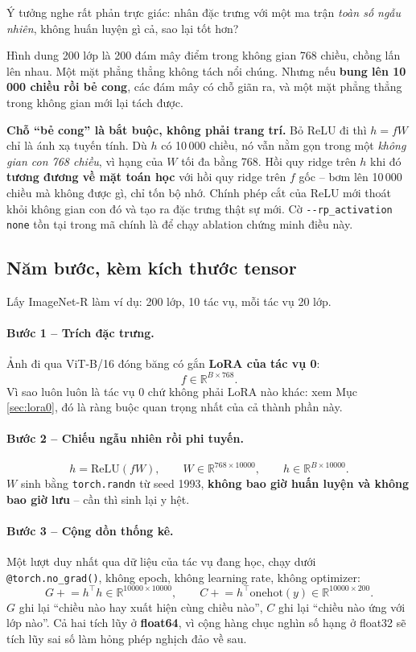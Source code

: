 \documentclass[11pt,a4paper]{article}
\newenvironment{luuy}{\begin{leftbar}\noindent\ignorespaces}{\end{leftbar}}
\begin{document}
Ý tưởng nghe rất phản trực giác: nhân đặc trưng với một ma trận \emph{toàn số
ngẫu nhiên}, không huấn luyện gì cả, sao lại tốt hơn?

Hình dung 200 lớp là 200 đám mây điểm trong không gian 768 chiều, chồng lấn lên
nhau. Một mặt phẳng thẳng không tách nổi chúng. Nhưng nếu \textbf{bung lên
10\,000 chiều rồi bẻ cong}, các đám mây có chỗ giãn ra, và một mặt phẳng thẳng
trong không gian mới lại tách được.

\begin{luuy}
\textbf{Chỗ ``bẻ cong'' là bắt buộc, không phải trang trí.} Bỏ ReLU đi thì
$h = fW$ chỉ là ánh xạ tuyến tính. Dù $h$ có 10\,000 chiều, nó vẫn nằm gọn trong
một \emph{không gian con 768 chiều}, vì hạng của $W$ tối đa bằng 768. Hồi quy
ridge trên $h$ khi đó \textbf{tương đương về mặt toán học} với hồi quy ridge trên
$f$ gốc -- bơm lên 10\,000 chiều mà không được gì, chỉ tốn bộ nhớ. Chính phép cắt
của ReLU mới thoát khỏi không gian con đó và tạo ra đặc trưng thật sự mới. Cờ
\texttt{-{}-rp\_activation none} tồn tại trong mã chính là để chạy ablation
chứng minh điều này.
\end{luuy}

\subsection{Năm bước, kèm kích thước tensor}
\label{sec:rp-buoc}

Lấy ImageNet-R làm ví dụ: 200 lớp, 10 tác vụ, mỗi tác vụ 20 lớp.

\paragraph{Bước 1 -- Trích đặc trưng.}
Ảnh đi qua ViT-B/16 đóng băng có gắn \textbf{LoRA của tác vụ 0}:
\[ f \in \mathbb{R}^{B \times 768} . \]
Vì sao luôn luôn là tác vụ 0 chứ không phải LoRA nào khác: xem Mục
\ref{sec:lora0}, đó là ràng buộc quan trọng nhất của cả thành phần này.

\paragraph{Bước 2 -- Chiếu ngẫu nhiên rồi phi tuyến.}
\[ h = \mathrm{ReLU}(fW), \qquad W \in \mathbb{R}^{768 \times 10000},
   \qquad h \in \mathbb{R}^{B \times 10000} . \]
$W$ sinh bằng \texttt{torch.randn} từ seed 1993, \textbf{không bao giờ huấn
luyện và không bao giờ lưu} -- cần thì sinh lại y hệt.

\paragraph{Bước 3 -- Cộng dồn thống kê.}
Một lượt duy nhất qua dữ liệu của tác vụ đang học, chạy dưới
\texttt{@torch.no\_grad()}, không epoch, không learning rate, không optimizer:
\[ G \mathrel{+}= h^{\top} h \in \mathbb{R}^{10000 \times 10000}, \qquad
   C \mathrel{+}= h^{\top}\mathrm{onehot}(y) \in \mathbb{R}^{10000 \times 200} . \]
$G$ ghi lại ``chiều nào hay xuất hiện cùng chiều nào'', $C$ ghi lại ``chiều nào
ứng với lớp nào''. Cả hai tích lũy ở \textbf{float64}, vì cộng hàng chục nghìn
số hạng ở float32 sẽ tích lũy sai số làm hỏng phép nghịch đảo về sau.
\end{document}
